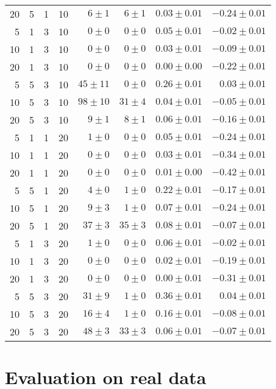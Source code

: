 \documentclass{article}
\begin{document}
\begin{table}
\begin{center}
\begin{tabular}{r r r r r r r r}
20 & 5 & 1 & 10 & $6 \pm 1$ & $6 \pm 1$ & $0.03 \pm 0.01$ & $-0.24 \pm 0.01$ \\
5 & 1 & 3 & 10 & $0 \pm 0$ & $0 \pm 0$ & $0.05 \pm 0.01$ & $-0.02 \pm 0.01$ \\
10 & 1 & 3 & 10 & $0 \pm 0$ & $0 \pm 0$ & $0.03 \pm 0.01$ & $-0.09 \pm 0.01$ \\
20 & 1 & 3 & 10 & $0 \pm 0$ & $0 \pm 0$ & $0.00 \pm 0.00$ & $-0.22 \pm 0.01$ \\
5 & 5 & 3 & 10 & $45 \pm 11$ & $0 \pm 0$ & $0.26 \pm 0.01$ & $0.03 \pm 0.01$ \\
10 & 5 & 3 & 10 & $98 \pm 10$ & $31 \pm 4$ & $0.04 \pm 0.01$ & $-0.05 \pm 0.01$ \\
20 & 5 & 3 & 10 & $9 \pm 1$ & $8 \pm 1$ & $0.06 \pm 0.01$ & $-0.16 \pm 0.01$ \\
5 & 1 & 1 & 20 & $1 \pm 0$ & $0 \pm 0$ & $0.05 \pm 0.01$ & $-0.24 \pm 0.01$ \\
10 & 1 & 1 & 20 & $0 \pm 0$ & $0 \pm 0$ & $0.03 \pm 0.01$ & $-0.34 \pm 0.01$ \\
20 & 1 & 1 & 20 & $0 \pm 0$ & $0 \pm 0$ & $0.01 \pm 0.00$ & $-0.42 \pm 0.01$ \\
5 & 5 & 1 & 20 & $4 \pm 0$ & $1 \pm 0$ & $0.22 \pm 0.01$ & $-0.17 \pm 0.01$ \\
10 & 5 & 1 & 20 & $9 \pm 3$ & $1 \pm 0$ & $0.07 \pm 0.01$ & $-0.24 \pm 0.01$ \\
20 & 5 & 1 & 20 & $37 \pm 3$ & $35 \pm 3$ & $0.08 \pm 0.01$ & $-0.07 \pm 0.01$ \\
5 & 1 & 3 & 20 & $1 \pm 0$ & $0 \pm 0$ & $0.06 \pm 0.01$ & $-0.02 \pm 0.01$ \\
10 & 1 & 3 & 20 & $0 \pm 0$ & $0 \pm 0$ & $0.02 \pm 0.01$ & $-0.19 \pm 0.01$ \\
20 & 1 & 3 & 20 & $0 \pm 0$ & $0 \pm 0$ & $0.00 \pm 0.01$ & $-0.31 \pm 0.01$ \\
5 & 5 & 3 & 20 & $31 \pm 9$ & $1 \pm 0$ & $0.36 \pm 0.01$ & $0.04 \pm 0.01$ \\
10 & 5 & 3 & 20 & $16 \pm 4$ & $1 \pm 0$ & $0.16 \pm 0.01$ & $-0.08 \pm 0.01$ \\
20 & 5 & 3 & 20 & $48 \pm 3$ & $33 \pm 3$ & $0.06 \pm 0.01$ & $-0.07 \pm 0.01$ \\
\hline
\end{tabular}
\end{center}
\end{table}

\section{Evaluation on real data}



\end{document}
